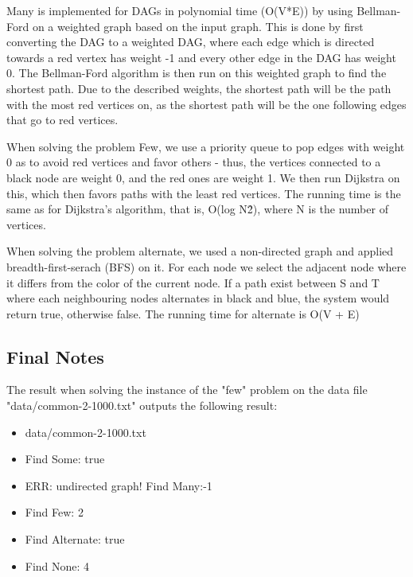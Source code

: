 \documentclass{tufte-handout}
\begin{document}
\medskip

Many is implemented for DAGs in polynomial time (O(V*E)) 
by using Bellman-Ford on a weighted graph based on the input graph.
This is done by first converting the DAG to a weighted DAG, where each edge which is 
directed towards a red vertex has weight -1 and every other edge in the DAG has weight 0.
The Bellman-Ford algorithm is then run on this weighted graph to find the shortest path. 
Due to the described weights, the shortest path will be the path with the most red vertices on,
as the shortest path will be the one following edges that go to red vertices.      

\medskip
         
When solving the problem Few, we use a priority queue to pop edges with weight 0
as to avoid red vertices and favor others - thus, the vertices connected to a
black node are weight 0, and the red ones are weight 1. 
We then run Dijkstra on this, which then favors paths with the least red 
vertices. 
The running time is the same as for Dijkstra's algorithm, that is, O(log N\^2),
where N is the number of vertices.

\medskip

\clearpage

When solving the problem alternate, we used a non-directed graph and applied breadth-first-serach (BFS) on it. 
For each node we select the adjacent node where
it differs from the color of the current node. If a path exist between S and T where
each neighbouring nodes alternates in black and blue, the system would return true, otherwise false.
The running time for alternate is O(V + E)

\subsection{Final Notes}

The result when solving the instance of the "few" problem on the data file "data/common-2-1000.txt" outputs the following result: 

\begin{itemize}
	\item data/common-2-1000.txt
	\item Find Some: true
	\item ERR: undirected graph! Find Many:-1
	\item Find Few: 2
	\item Find Alternate: true
	\item Find None: 4 
\end{itemize}
\end{document}
